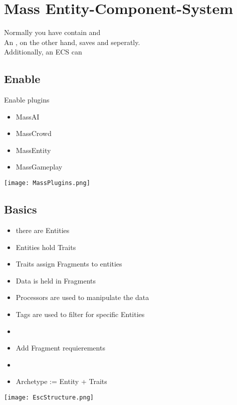 \chapter{Mass Entity-Component-System}
    Normally you have  contain  and  \\
    An , on the other hand, saves  and  seperatly. \\
    Additionally, an ECS can 

    \section{Enable}
        Enable plugins
        \begin{itemize}
            \item MassAI
            \item MassCrowd
            \item MassEntity
            \item MassGameplay
        \end{itemize}
         \texttt{[image: MassPlugins.png]}

    \section{Basics}
        \begin{itemize}
            \item there are Entities
            \item Entities hold Traits
            \item Traits assign Fragments to entities
            \item Data is held in Fragments
            \item Processors are used to manipulate the data
            \item Tags are used to filter for specific Entities
            \item 
            \item Add Fragment requierements
            \item 
            \item Archetype := Entity + Traits
        \end{itemize}
        \texttt{[image: EscStructure.png]}


